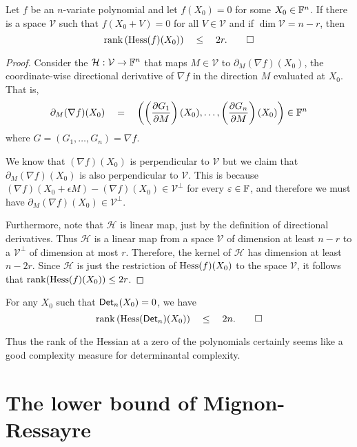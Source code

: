 \begin{lemma}\label{lem:hess-large-perturbations}
Let $f$ be an $n$-variate polynomial and let $f(X_0) = 0$ for some $X_0 \in \mathbb{F}^n$. If there is a space $\mathcal{V}$ such that $f(X_0 + V) = 0$ for all $V \in \mathcal{V}$ and if $\dim \mathcal{V} = n - r$, then
\[
\operatorname{rank}\left(\operatorname{Hess}(f)(X_0)\right) \quad \leq \quad 2r. \qedhere
\]
\end{lemma}
\begin{proof}
Consider the $\mathcal{H}:\mathcal{V} \rightarrow \mathbb{F}^n$ that maps $M \in \mathcal{V}$ to $\partial_M(\nabla f) (X_0)$, the coordinate-wise directional derivative of $\nabla f$ in the direction $M$ evaluated at $X_0$. That is, 
\[
\partial_M(\nabla f) (X_0) \quad = \quad \left(\left(\frac{\partial G_1}{\partial M}\right) (X_0) , \ldots, \left(\frac{\partial G_n}{\partial M}\right) (X_0)\right) \in \mathbb{F}^n
\]
where $G = (G_1, \ldots, G_n) = \nabla f$. 

We know that $(\nabla f)(X_0)$ is perpendicular to $\mathcal{V}$ but we claim that $\partial_M(\nabla f) (X_0)$ is also perpendicular to $\mathcal{V}$. This is because $(\nabla f)( X_0 + \epsilon M) - (\nabla f)(X_0) \in \mathcal{V}^\perp$ for every $\varepsilon \in \mathbb{F}$, and therefore we must have $\partial_M(\nabla f)(X_0) \in \mathcal{V}^{\perp}$. 

Furthermore, note that $\mathcal{H}$ is linear map, just by the definition of directional derivatives. Thus $\mathcal{H}$ is a linear map from a space $\mathcal{V}$ of dimension at least $n-r$ to a $\mathcal{V}^\perp$ of dimension at most $r$. Therefore, the kernel of $\mathcal{H}$ has dimension at least $n - 2r$. Since $\mathcal{H}$ is just the restriction of $\operatorname{Hess}(f)(X_0)$ to the space $\mathcal{V}$, it follows that $\operatorname{rank}(\operatorname{Hess}(f)(X_0)) \leq 2r$. 
\end{proof}



\begin{corollarywp}\label{cor:hess-det}
For any $X_0$ such that $\operatorname{\mathsf{Det}}_n(X_0) = 0$, we have
\[
\operatorname{rank}\left(\operatorname{Hess}(\operatorname{\mathsf{Det}}_n)(X_0)\right) \quad \leq \quad 2n. \qedhere
\]
\end{corollarywp}

Thus the rank of the Hessian at a zero of the polynomials certainly seems like a good complexity measure for determinantal complexity. 

\section{The lower bound of Mignon-Ressayre}

